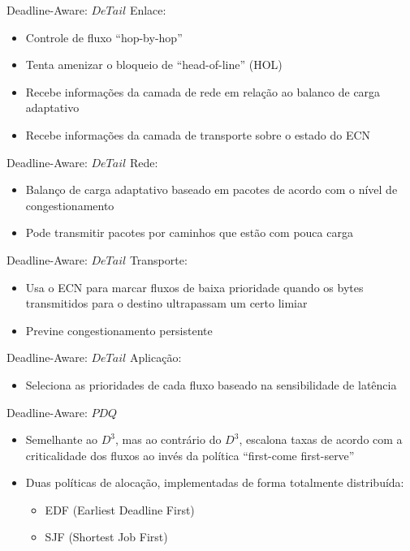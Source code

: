 \documentclass[aspectratio=169]{beamer}
\begin{document}
	\begin{frame} {Deadline-Aware: $DeTail$}
		Enlace:
		\begin{itemize}
		 	\item
		 		Controle de fluxo “hop-by-hop” 
		 	\item
				Tenta amenizar o bloqueio de “head-of-line” (HOL)
		 	\item
				Recebe informações da camada de rede em relação ao balanco de carga adaptativo
		 	\item
				Recebe informações da camada de transporte sobre o estado do ECN
		 \end{itemize}
	\end{frame}

	\begin{frame} {Deadline-Aware: $DeTail$}
		Rede:
		\begin{itemize}
		 	\item
		 		Balanço de carga adaptativo baseado em pacotes de acordo com o nível de congestionamento
		 	\item
				Pode transmitir pacotes por caminhos que estão com pouca carga
		 \end{itemize}
	\end{frame}

	\begin{frame} {Deadline-Aware: $DeTail$}
		Transporte:
		\begin{itemize}
		 	\item
		 		Usa o ECN para marcar fluxos de baixa prioridade quando os bytes transmitidos para o destino ultrapassam um certo limiar
		 	\item
				Previne congestionamento persistente
		 \end{itemize}
	\end{frame}

	\begin{frame} {Deadline-Aware: $DeTail$}
		Aplicação:
		\begin{itemize}
		 	\item
		 		Seleciona as prioridades de cada fluxo baseado na sensibilidade de latência
		 \end{itemize}
	\end{frame}

	\begin{frame} {Deadline-Aware: $PDQ$}
		\begin{itemize}
		 	\item
		 		Semelhante ao $D^3$, mas ao contrário do $D^3$, escalona taxas de acordo com a criticalidade dos fluxos ao invés da política “first-come first-serve”
		 	\item
		 		Duas políticas de alocação, implementadas de forma totalmente distribuída:
				\begin{itemize}
				 	\item
				 		EDF (Earliest Deadline First)
				 	\item
						SJF (Shortest Job First)
				 \end{itemize}
		\end{itemize}
	\end{frame}
\end{document}

